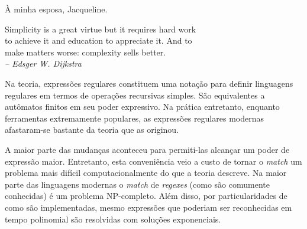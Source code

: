 \documentclass[a4paper,12pt,oneside,onecolumn]{uerj}
\begin{document}
\frontmatter
\capa
\folhaderosto

%

\begin{folhadeaprovacao}
\end{folhadeaprovacao}


  \vfill\vfill
    \hfill À minha esposa, Jacqueline.
  \vfill



\pretextualchapter{}

  \vfill\vfill\vfill\vfill
  \begin{flushright}
     Simplicity is a great virtue but it requires hard work\\
     to achieve it and education to appreciate it. And to \\
     make matters worse: complexity sells better.\\
    \textsl{-- Edsger W. Dijkstra}
  \end{flushright}
  \vfill




Na teoria, expressões regulares constituem uma notação para definir linguagens regulares em termos de operações recursivas simples. São equivalentes a autômatos finitos em seu poder expressivo. Na prática entretanto, enquanto ferramentas extremamente populares, as expressões regulares modernas afastaram-se bastante da teoria que as originou. 

A maior parte das mudanças aconteceu para permiti-las alcançar um poder de expressão maior. Entretanto, esta conveniência veio a custo de tornar o \emph{match} um problema mais difícil computacionalmente do que a teoria descreve. Na maior parte das linguagens modernas o \emph{match} de \emph{regexes} (como são comumente conhecidas) é um problema NP-completo. Além disso, por particularidades de como são implementadas, mesmo expressões que poderiam ser reconhecidas em tempo polinomial são resolvidas com soluções exponenciais. 
\end{document}
